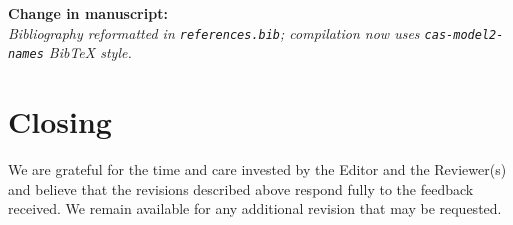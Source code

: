 \documentclass[11pt,a4paper]{article}
\newcommand{\change}[1]{\par\noindent\textbf{\color{green!50!black}Change in manuscript:}\\ \emph{#1}\par\smallskip}
\begin{document}
\change{Bibliography reformatted in \texttt{references.bib}; compilation
now uses \texttt{cas-model2-names} BibTeX style.}

\section*{Closing}

We are grateful for the time and care invested by the Editor and the
Reviewer(s) and believe that the revisions described above respond fully
to the feedback received. We remain available for any additional revision
that may be requested.
\end{document}
